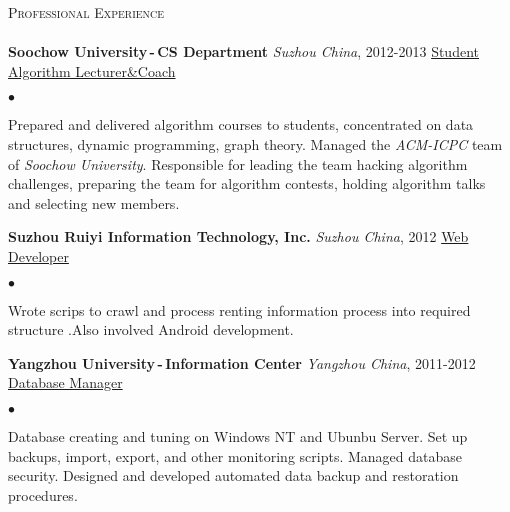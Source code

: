 \documentclass[11pt]{article}
\newcommand{\lineunder}{\vspace*{-8pt} \\ \hspace*{-18pt} \hrulefill \\}
\newcommand{\header}[2]{{\hspace*{-15pt}\vspace*{6pt} \textsc{\large #1}\hfill{\footnotesize #2}} \vspace*{-6pt} \lineunder}
\newcommand{\employer}[4]{{ \textbf{#1} \emph{#2}, #3 \hfill \underline{#4}\\ }}
\newenvironment{achievements}{\begin{list}{$\bullet$}{\topsep 0pt \itemsep -2pt}}{\vspace*{4pt}\end{list}}
\begin{document}

\header{Professional Experience}{}

\employer{Soochow University\,-\,CS Department}{Suzhou China}{2012-2013} {Student Algorithm Lecturer\&Coach}
	\begin{achievements}
    \item Prepared and delivered algorithm courses to students, concentrated on
        data structures, dynamic programming, graph theory. Managed the \emph{ACM-ICPC} team of \emph{Soochow University}. Responsible for leading the team hacking algorithm
        challenges, preparing the team for algorithm contests, holding algorithm talks and selecting new members.
	\end{achievements}

\employer{Suzhou Ruiyi Information Technology, Inc.}{Suzhou China}{2012}{Web Developer}
	\begin{achievements}
        \item Wrote scrips to crawl and process renting information process into required structure .Also involved Android development.
	\end{achievements}

\employer{Yangzhou University\,-\,Information Center}{Yangzhou China}{2011-2012}{Database Manager}
	\begin{achievements}
    \item Database creating and tuning on Windows NT and Ubunbu Server. Set up backups, import, export, and other monitoring scripts.  Managed database security. Designed and developed automated data backup and restoration procedures.

	\end{achievements}
\end{document}
